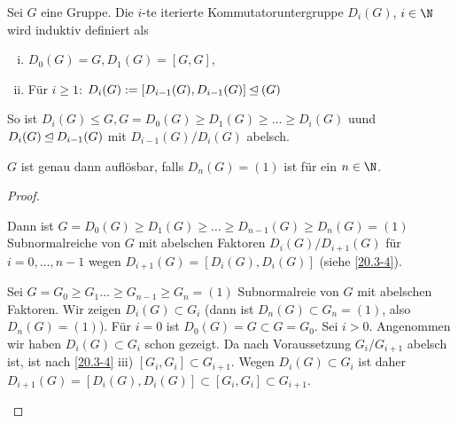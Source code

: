\begin{df} \label{20.3-5}
	Sei $G$ eine Gruppe.
	Die $i$-te iterierte Kommutatoruntergruppe $D_i(G)$, $i \in \N$ wird induktiv definiert als
	\begin{enumerate}[i)]
		\item
			$D_0(G) = G, D_1(G) = [G, G]$,
		\item
			Für $i \ge 1$: $D_i(G) := [D_{i-1}(G), D_{i-1}(G)] \mathbin{\trianglelefteq}(G)$
	\end{enumerate}
	So ist $D_i(G) \le G, G = D_0(G) \ge D_1(G) \ge \dotsc \ge D_i(G)$ uund $D_i(G) \mathbin{\trianglelefteq} D_{i-1}(G)$ mit $D_{i-1}(G) / D_i(G)$ abelsch.
\end{df}

\begin{st} \label{20.3-6}
	$G$ ist genau dann auflösbar, falls $D_n(G) = (1)$ ist für ein $n \in \N$.
	\begin{proof}
		\begin{segnb}{\ProofImplication*}
			Dann ist $G = D_0(G) \ge D_1(G) \ge \dotsc \ge D_{n-1}(G) \ge D_n(G) = (1)$ Subnormalreiche von $G$ mit abelschen Faktoren $D_i(G) / D_{i+1}(G)$ für $i = 0, \dotsc, n-1$ wegen $D_{i+1}(G) = [D_i(G), D_i(G)]$ (siehe \ref{20.3-4}).

		\end{segnb}
		\begin{segnb}{\ProofImplication}
			Sei $G = G_0 \ge G_1 \dotsc \ge G_{n-1} \ge G_n = (1)$ Subnormalreie von $G$ mit abelschen Faktoren.
			Wir zeigen $D_i(G) \subset G_i$ (dann ist $D_n(G) \subset G_n = (1)$, also $D_n(G) = (1)$).
			Für $i = 0$ ist $D_0(G) = G \subset G = G_0$.
			Sei $i > 0$.
			Angenommen wir haben $D_i(G) \subset G_i$ schon gezeigt.
			Da nach Voraussetzung $G_i / G_{i+1}$ abelsch ist, ist nach \ref{20.3-4} iii) $[G_i, G_i] \subset G_{i+1}$.
			Wegen $D_i(G) \subset G_i$ ist daher $D_{i+1}(G) = [D_i(G), D_i(G)] \subset [G_i, G_i]\subset G_{i+1}$.
		\end{segnb}
	\end{proof}
\end{st}

